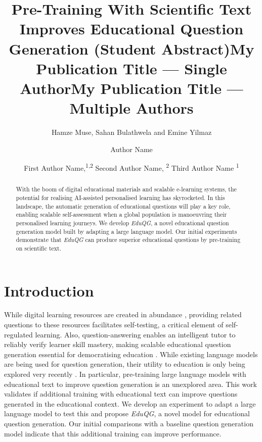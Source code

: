 \documentclass[letterpaper]{article} %
\title{Pre-Training With Scientific Text Improves Educational Question Generation (Student Abstract)}
\author{
Hamze Muse\equalcontrib,
Sahan Bulathwela\equalcontrib
and Emine Yilmaz
}
\title{My Publication Title --- Single Author}
\author {
    Author Name
}
\title{My Publication Title --- Multiple Authors}
\author {
    First Author Name,\textsuperscript{\rm 1,\rm 2}
    Second Author Name, \textsuperscript{\rm 2}
    Third Author Name \textsuperscript{\rm 1}
}
\begin{document}
\maketitle

\begin{abstract}
With the boom of digital educational materials and scalable e-learning systems, the potential for realising AI-assisted personalised learning has skyrocketed. In this landscape, the automatic generation of educational questions will play a key role, enabling scalable self-assessment when a global population is manoeuvring their personalised learning journeys. We develop \textit{EduQG}, a novel educational question generation model built by adapting a large language model. Our initial experiments demonstrate that \textit{EduQG} can produce superior educational questions by pre-training on scientific text.
\end{abstract}

\section{Introduction}
While digital learning resources are created in abundance
\cite{truelearn}, providing related questions
to these resources
facilitates self-testing, a critical element of self-regulated learning.
Also, question-answering enables an intelligent tutor to reliably verify learner skill mastery,
making scalable educational question generation essential for democratising education \cite{ai_ed_demo,zhang2021review}.
While existing language models are being used for question generation,
their utility
to education is only being explored very recently \cite{wang2022towards}. In particular, pre-training large language models with educational text to improve question generation is an unexplored area.
This work validates if additional training with educational text can improve questions generated in the educational context. We develop an experiment to adapt a large language model to test this and propose \emph{EduQG}, a novel model for educational question generation. Our initial comparisons with a baseline question generation model indicate that this additional training can improve performance.
\end{document}
